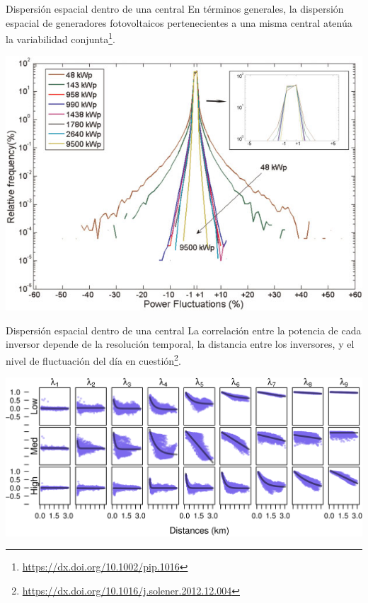 \documentclass[aspectratio=169, usenames,svgnames,dvipsnames]{beamer}
\begin{document}
\begin{frame}[label={sec:org88ae985}]{Dispersión espacial dentro de una central}
En términos generales, la \alert{dispersión espacial} de generadores
fotovoltaicos pertenecientes a \alert{una misma central} \alert{atenúa} la
variabilidad conjunta\footnote{\url{https://dx.doi.org/10.1002/pip.1016}}.

\begin{center}
\includegraphics[height=0.7\textheight]{../figs/Variabilidad_DispersionGeografica_Planta.png}
\end{center}
\end{frame}

\begin{frame}[label={sec:org0ff7066}]{Dispersión espacial dentro de una central}
La correlación entre la potencia de cada inversor \alert{depende} de la \alert{resolución temporal}, la \alert{distancia} entre los inversores, y el \alert{nivel de fluctuación del día} en cuestión\footnote{\url{https://dx.doi.org/10.1016/j.solener.2012.12.004}}.

\begin{center}
\includegraphics[height=0.6\textheight]{../figs/corDistMatrix_nls.png}
\end{center}
\end{frame}
\end{document}

